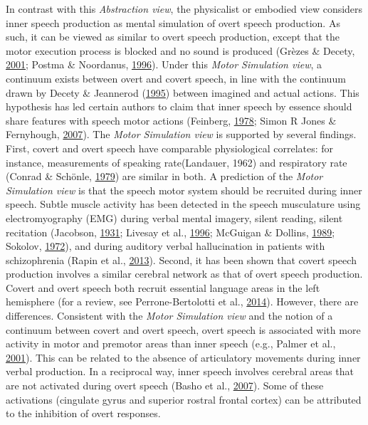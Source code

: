 \documentclass[a4paper,12pt,twoside,onecolumn,openright,final,oldfontcommands]{memoir}
\begin{document}
In contrast with this \emph{Abstraction view}, the physicalist or embodied view considers inner speech production as mental simulation of overt speech production. As such, it can be viewed as similar to overt speech production, except that the motor execution process is blocked and no sound is produced (Grèzes \& Decety, \protect\hyperlink{ref-grezes_functional_2001}{2001}; Postma \& Noordanus, \protect\hyperlink{ref-postma_production_1996}{1996}). Under this \emph{Motor Simulation view}, a continuum exists between overt and covert speech, in line with the continuum drawn by Decety \& Jeannerod (\protect\hyperlink{ref-decety_mentally_1995}{1995}) between imagined and actual actions. This hypothesis has led certain authors to claim that inner speech by essence should share features with speech motor actions (Feinberg, \protect\hyperlink{ref-feinberg_efference_1978}{1978}; Simon R Jones \& Fernyhough, \protect\hyperlink{ref-Jones2007}{2007}). The \emph{Motor Simulation view} is supported by several findings. First, covert and overt speech have comparable physiological correlates: for instance, measurements of speaking rate(Landauer, 1962) and respiratory rate (Conrad \& Schönle, \protect\hyperlink{ref-conrad_speech_1979}{1979}) are similar in both. A prediction of the \emph{Motor Simulation view} is that the speech motor system should be recruited during inner speech. Subtle muscle activity has been detected in the speech musculature using electromyography (EMG) during verbal mental imagery, silent reading, silent recitation (Jacobson, \protect\hyperlink{ref-jacobson_electrical_1931}{1931}; Livesay et al., \protect\hyperlink{ref-livesay_covert_1996}{1996}; McGuigan \& Dollins, \protect\hyperlink{ref-mcguigan_patterns_1989}{1989}; Sokolov, \protect\hyperlink{ref-sokolov_inner_1972}{1972}), and during auditory verbal hallucination in patients with schizophrenia (Rapin et al., \protect\hyperlink{ref-Rapin2013}{2013}). Second, it has been shown that covert speech production involves a similar cerebral network as that of overt speech production. Covert and overt speech both recruit essential language areas in the left hemisphere (for a review, see Perrone-Bertolotti et al., \protect\hyperlink{ref-Perrone-Bertolotti2014}{2014}). However, there are differences. Consistent with the \emph{Motor Simulation view} and the notion of a continuum between covert and overt speech, overt speech is associated with more activity in motor and premotor areas than inner speech (e.g., Palmer et al., \protect\hyperlink{ref-palmer_event-related_2001}{2001}). This can be related to the absence of articulatory movements during inner verbal production. In a reciprocal way, inner speech involves cerebral areas that are not activated during overt speech (Basho et al., \protect\hyperlink{ref-basho_effects_2007}{2007}). Some of these activations (cingulate gyrus and superior rostral frontal cortex) can be attributed to the inhibition of overt responses.
\end{document}
